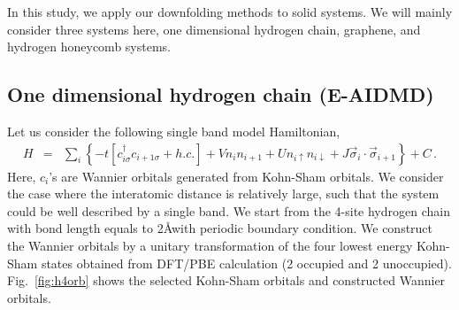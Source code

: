 \documentclass[prl,12pt,onecolumn,nofootinbib,notitlepage,english,superscriptaddress]{revtex4-1}
\begin{document}
In this study, we apply our downfolding methods to solid systems. We will mainly consider three systems here, one dimensional hydrogen chain, graphene, and hydrogen honeycomb systems. 

\subsection{One dimensional hydrogen chain (E-AIDMD)}
Let us consider the following single band model Hamiltonian,
\begin{eqnarray}\label{eq:h4model}
H &=& \sum_{i}\left\{-t[c^{\dagger}_{i\sigma}c_{i+1\sigma} +h.c.]+ Vn_{i}n_{i+1} + Un_{i\uparrow}n_{i\downarrow}+ J\vec \sigma_{i}\cdot \vec \sigma_{i+1}\right\} + C\,.
\end{eqnarray}
Here, $c_{i}$'s are Wannier orbitals generated from Kohn-Sham orbitals. We consider the case where the interatomic distance is relatively large, such that the system could be well described by a single band.  We start from the 4-site hydrogen chain with bond length equals to 2\AA with periodic boundary condition. We construct the Wannier orbitals by a unitary transformation of the four lowest energy Kohn-Sham states obtained from DFT/PBE calculation (2 occupied and 2 unoccupied). Fig.~\ref{fig:h4orb} shows the selected Kohn-Sham orbitals and constructed Wannier orbitals. 
\end{document}

